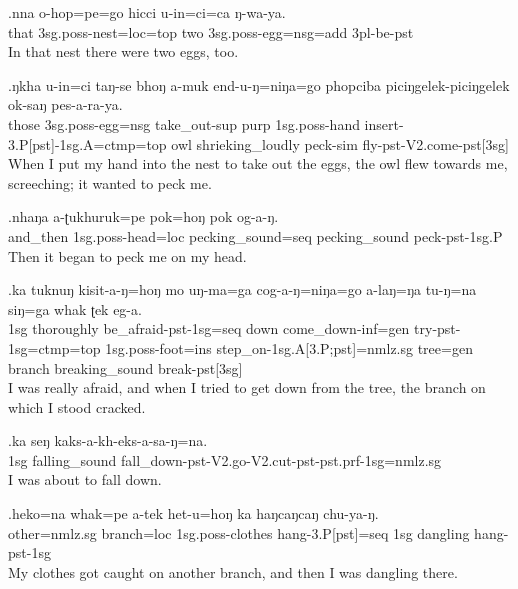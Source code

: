 \exg.nna  o-hop=pe=go                  hicci u-in=ci=ca                     ŋ-wa-ya.\\
 that {\sc 3sg.poss-}nest{\sc =loc=top}  two   {\sc 3sg.poss-}egg{\sc =nsg=add} {\sc 3pl-}be{\sc -pst}\\
In that nest there were two eggs, too.

\exg.ŋkha u-in=ci              taŋ-se            bhoŋ a-muk           end-u-ŋ=niŋa=go  phopciba piciŋgelek-piciŋgelek ok-saŋ pes-a-ra-ya.\\
 those {\sc 3sg.poss-}egg{\sc =nsg} take\_out{\sc -sup} {\sc purp}  {\sc 1sg.poss-}hand insert{\sc -3.P[pst]-1sg.A=ctmp=top}  owl      shrieking\_loudly        peck{\sc -sim} fly{\sc -pst-V2.come-pst[3sg]}\\
When I put my hand into the nest to take out the eggs, the owl flew towards me, screeching; it wanted to peck me.

\exg.nhaŋa   a-ʈukhuruk=pe            pok=hoŋ             pok           og-a-ŋ.\\
 and\_then {\sc 1sg.poss-}head{\sc =loc} pecking\_sound{\sc =seq}  pecking\_sound peck{\sc -pst-1sg.P}\\
Then it began to peck me on my head.

\exg.ka  tuknuŋ    kisit-a-ŋ=hoŋ mo   uŋ-ma=ga cog-a-ŋ=niŋa=go a-laŋ=ŋa tu-ŋ=na siŋ=ga    whak   ʈek           eg-a.\\
 {\sc 1sg} thoroughly be\_afraid{\sc -pst-1sg=seq}  down come\_down{\sc -inf=gen} try{\sc -pst-1sg=ctmp=top}
 {\sc 1sg.poss-}foot{\sc =ins} step\_on{\sc -1sg.A[3.P;pst]=nmlz.sg} tree{\sc =gen} branch breaking\_sound break{\sc -pst[3sg]}\\
I was really afraid, and when I tried to get down from the tree, the branch on which I stood cracked.

\exg.ka  seŋ          kaks-a-kh-eks-a-sa-ŋ=na.\\
 {\sc 1sg} falling\_sound fall\_down{\sc -pst-V2.go-V2.cut-pst-pst.prf-1sg=nmlz.sg}\\
I was about to fall down.

\exg.heko=na         whak=pe      a-tek              het-u=hoŋ              ka  haŋcaŋcaŋ chu-ya-ŋ.\\
 other{\sc =nmlz.sg} branch{\sc =loc} {\sc 1sg.poss-}clothes hang{\sc -3.P[pst]=seq}  {\sc 1sg} dangling     hang{\sc -pst-1sg}\\
My clothes got caught on another branch, and then I was dangling there.

